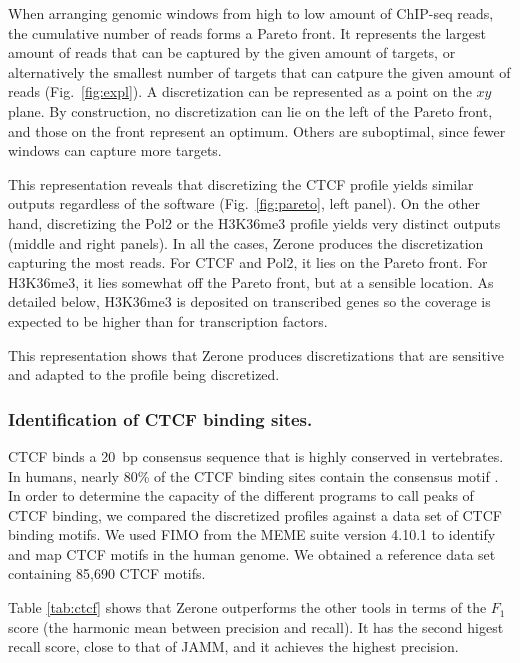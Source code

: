 \documentclass{bioinfo}
\begin{document}
When arranging genomic windows from high to low amount of ChIP-seq
reads, the cumulative number of reads forms a Pareto front.
It represents the largest amount of reads that can be captured by the
given amount of targets, or alternatively the smallest number of
targets that can catpure the given amount of reads
(Fig.~\ref{fig:expl}). A discretization can be represented as a point
on the $xy$ plane.  By construction, no discretization can lie on the
left of the Pareto front, and those on the front represent an
optimum. Others are suboptimal, since fewer windows can capture more
targets.


This representation reveals that discretizing the CTCF profile yields
similar outputs regardless of the software (Fig.~\ref{fig:pareto},
left panel). On the other hand, discretizing the Pol2 or the H3K36me3
profile yields very distinct outputs (middle and right panels). In
all the cases, Zerone produces the discretization capturing the most
reads. For CTCF and Pol2, it lies on the Pareto front. For H3K36me3,
it lies somewhat off the Pareto front, but at a sensible location.
As detailed below, H3K36me3 is deposited on transcribed genes
\citep{pmid16122420,pmid23739122} so the coverage is expected to
be higher than for transcription factors.

This representation shows that Zerone produces discretizations that
are sensitive and adapted to the profile being discretized.

\subsubsection{Identification of CTCF binding sites.}
CTCF binds a 20~bp consensus sequence that is highly conserved in
vertebrates. In humans, nearly 80\% of the CTCF binding
sites contain the consensus motif \citep{pmid17382889}. In order to
determine the capacity of the different programs to call peaks of CTCF
binding, we compared the discretized profiles against a data set of CTCF
binding motifs. We used FIMO \citep{pmid21330290} from the MEME suite
version 4.10.1 \citep{pmid19458158} to identify and map CTCF motifs in
the human genome. We obtained a reference data set containing 85,690
CTCF motifs.

Table \ref{tab:ctcf} shows that Zerone outperforms the other tools
in terms of the $F_1$ score (the harmonic mean between precision and
recall). It has the second higest recall score, close to that of JAMM,
and it achieves the highest precision.
\end{document}
